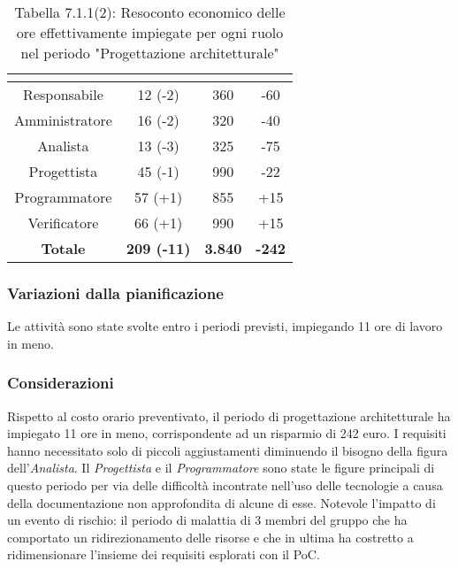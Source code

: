 \renewcommand{\arraystretch}{1.4}
\begin{table}[H]
\begin{center}
\begin{tabular}{|c|c|c|c|}
\hline
\rowcolor{title_row}
\textbf{\color{title_text}{Ruolo}}  & \textbf{\color{title_text}{Ore}} & \textbf{\color{title_text}{Costo in \euro}} & \textbf{\color{title_text}{Differenza al preventivo in \euro}} \\ \hline
Responsabile    & 12 (-2) & 360 & -60 \\ \hline
Amministratore  & 16 (-2) & 320 &  -40 \\ \hline
Analista        & 13 (-3) & 325 & -75 \\ \hline
Progettista     & 45 (-1) & 990 & -22 \\ \hline
Programmatore   & 57 (+1) & 855 & +15  \\ \hline
Verificatore    & 66 (+1) & 990 & +15  \\ \hline
\textbf{Totale} & \textbf{209 (-11)}    & \textbf{3.840} & \textbf{-242} \\ \hline
\end{tabular}
\caption{Tabella 7.1.1(2): Resoconto economico delle ore effettivamente impiegate per ogni ruolo nel periodo "Progettazione architetturale"\label{}}
\end{center}
\end{table}
\renewcommand{\arraystretch}{1}


\subsubsection{Variazioni dalla pianificazione}
Le attività sono state svolte entro i periodi previsti, impiegando 11 ore di lavoro in meno.

\subsubsection{Considerazioni}
Rispetto al costo orario preventivato, il periodo di progettazione architetturale ha impiegato 11 ore in meno, corrispondente ad un risparmio di 242 euro.
I requisiti hanno necessitato solo di piccoli aggiustamenti diminuendo il bisogno della figura dell'\emph{Analista}. Il \emph{Progettista} e il \emph{Programmatore} sono state le figure principali di questo periodo per via delle difficoltà incontrate nell'uso delle tecnologie a causa della documentazione non approfondita di alcune di esse.
Notevole l'impatto di un evento di rischio: il periodo di malattia di 3 membri del gruppo che ha comportato un ridirezionamento delle risorse e che in ultima ha costretto a ridimensionare l'insieme dei requisiti esplorati con il PoC.
\pagebreak
